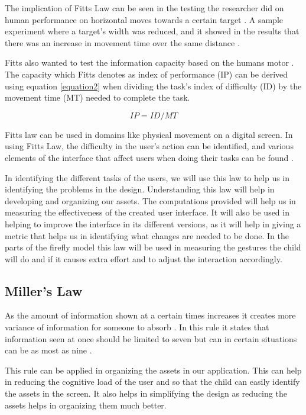 The implication of Fitts Law can be seen in the testing the researcher did on human performance on horizontal moves towards a certain target \cite{mackenzie1992extending}. A sample experiment where a target's width was reduced, and it showed in the results that there was an increase in movement time over the same distance \cite{mackenzie1992fitts}. 

Fitts also wanted to test the information capacity based on the humans motor \cite{mackenzie1992fitts}. The capacity which Fitts denotes as index of performance (IP) can be derived using equation \ref{equation2} when dividing the task's index of difficulty (ID) by the movement time (MT) needed to complete the task.

\begin{equation}
    IP = ID/MT
    \label{equation2}
\end{equation}

Fitts law can be used in domains like physical movement on a digital screen. In using Fitts Law, the difficulty in the user's action can be identified, and various elements of the interface that affect users when doing their tasks can be found \cite{mackenzie1992extending}.

In identifying the different tasks of the users, we will use this law to help us in identifying the problems in the design. Understanding this law will help in developing and organizing our assets. The computations provided will help us in measuring the effectiveness of the created user interface. It will also be used in helping to improve the interface in its different versions, as it will help in giving a metric that helps us in identifying what changes are needed to be done. In the parts of the firefly model this law will be used in measuring the gestures the child will do and if it causes extra effort and to adjust the interaction accordingly.

\subsection{Miller's Law}
As the amount of information shown at a certain times increases it creates more variance of information for someone to absorb \cite{miller1956magical}. In this rule it states that information seen at once should be limited to seven but can in certain situations can be as most as nine \cite{miller1956magical}. 

This rule can be applied in  organizing the assets in our application. This can help in reducing the cognitive load of the user and so that the child can easily identify the assets in the screen. It also helps in simplifying the design as reducing the assets helps in organizing them much better. 

